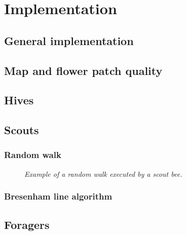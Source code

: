 \section{Implementation}
\subsection{General implementation}
\subsection{Map and flower patch quality}
\subsection{Hives}
\subsection{Scouts}
	\subsubsection{Random walk}
		\begin{figure}\label{fig:randomWalk}
			\centering
			\caption{\textit{Example of a random walk executed by a scout bee.}}
		\end{figure}
	\subsubsection{Bresenham line algorithm}

\subsection{Foragers}
